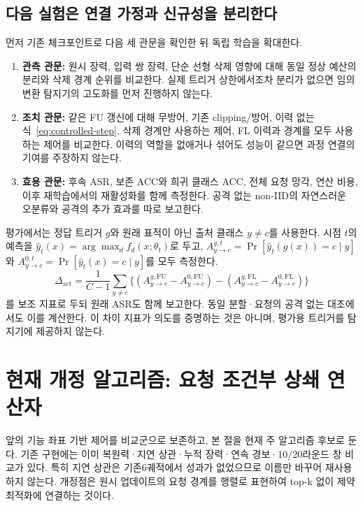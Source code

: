 \documentclass[10pt,a4paper]{article}
\begin{document}
\subsection{다음 실험은 연결 가정과 신규성을 분리한다}
먼저 기존 체크포인트로 다음 세 관문을 확인한 뒤 독립 학습을 확대한다.
\begin{enumerate}
\item \textbf{관측 관문:} 원시 장력, 입력 쌍 장력, 단순 선형 삭제 영향에 대해
      동일 정상 예산의 분리와 삭제 경계 순위를 비교한다. 실제 트리거 상한에서조차
      분리가 없으면 임의 변환 탐지기의 고도화를 먼저 진행하지 않는다.
\item \textbf{조치 관문:} 같은 FU 갱신에 대해 무방어, 기존 clipping/방어,
      이력 없는 식~\eqref{eq:controlled-step}, 삭제 경계만 사용하는 제어,
      FL 이력과 경계를 모두 사용하는 제어를 비교한다.
      이력의 역할을 없애거나 섞어도 성능이 같으면 과정 연결의 기여를 주장하지 않는다.
\item \textbf{효용 관문:} 후속 ASR, 보존 ACC와 희귀 클래스 ACC, 전체 요청 망각,
      연산 비용, 이후 재학습에서의 재활성화를 함께 측정한다.
      공격 없는 non-IID의 자연스러운 오분류와 공격의 추가 효과를 따로 보고한다.
\end{enumerate}
평가에서는 정답 트리거 $g$와 원래 표적이 아닌 출처 클래스 $y\ne c$를 사용한다.
시점 $t$의 예측을 $\widehat y_t(x)=\arg\max_df_d(x;\theta_t)$로 두고,
$A^{g,t}_{y\to c}=\Pr[\widehat y_t(g(x))=c\mid y]$와
$A^{0,t}_{y\to c}=\Pr[\widehat y_t(x)=c\mid y]$를 모두 측정한다.
\begin{equation}
 \Delta_{\mathrm{act}}=\frac1{C-1}\sum_{y\ne c}
 \big\{(A^{g,\mathrm{FU}}_{y\to c}-A^{0,\mathrm{FU}}_{y\to c})
       -(A^{g,\mathrm{FL}}_{y\to c}-A^{0,\mathrm{FL}}_{y\to c})\big\}
\end{equation}
를 보조 지표로 두되 원래 ASR도 함께 보고한다.
동일 분할·요청의 공격 없는 대조에서도 이를 계산한다.
이 차이 지표가 의도를 증명하는 것은 아니며, 평가용 트리거를 탐지기에 제공하지 않는다.

\section{현재 개정 알고리즘: 요청 조건부 상쇄 연산자}
\label{sec:operator-revision}
앞의 기능 좌표 기반 제어를 비교군으로 보존하고, 본 절을 현재 주 알고리즘 후보로 둔다.
기존 구현에는 이미 복원력·지연 상관·누적 장력·연속 경보·10/20라운드 창 비교가 있다.
특히 지연 상관은 기존6궤적에서 성과가 없었으므로 이름만 바꾸어 재사용하지 않는다.
개정점은 원시 업데이트의 요청 경계를 행렬로 표현하여 top-k 없이 제약 최적화에 연결하는 것이다.
\end{document}
